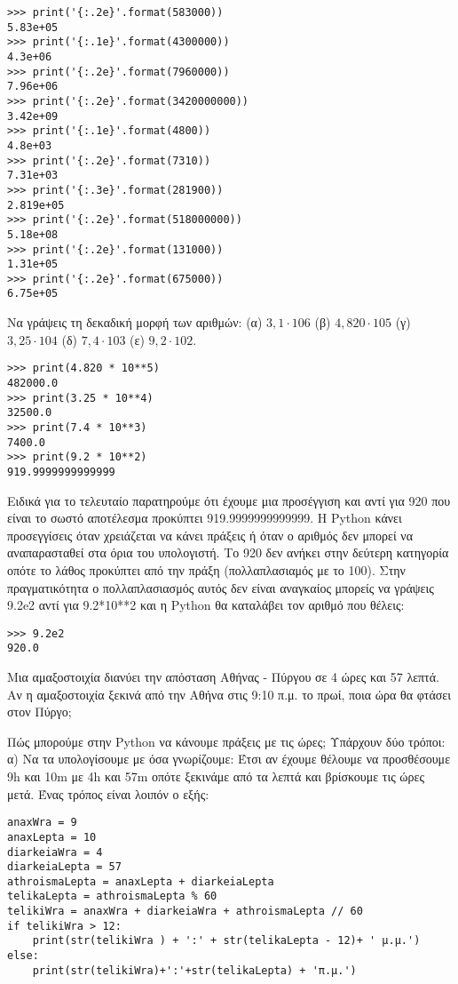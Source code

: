 \begin{lstlisting}
>>> print('{:.2e}'.format(583000))
5.83e+05
>>> print('{:.1e}'.format(4300000))
4.3e+06
>>> print('{:.2e}'.format(7960000))
7.96e+06
>>> print('{:.2e}'.format(3420000000))
3.42e+09
>>> print('{:.1e}'.format(4800))
4.8e+03
>>> print('{:.2e}'.format(7310))
7.31e+03
>>> print('{:.3e}'.format(281900))
2.819e+05
>>> print('{:.2e}'.format(518000000))
5.18e+08
>>> print('{:.2e}'.format(131000))
1.31e+05
>>> print('{:.2e}'.format(675000))
6.75e+05
\end{lstlisting}
\begin{exercise}
Nα γράψεις τη δεκαδική μορφή των αριθμών:
(α) $3,1 \cdot 106$ (β) $4,820 \cdot 105$ (γ) $3,25 \cdot 104$ (δ) $7,4 \cdot 103$ (ε) $9,2 \cdot 102$.
\end{exercise}
\begin{lstlisting}
>>> print(4.820 * 10**5)
482000.0
>>> print(3.25 * 10**4)
32500.0
>>> print(7.4 * 10**3)
7400.0
>>> print(9.2 * 10**2)
919.9999999999999
\end{lstlisting}
Ειδικά για το τελευταίο παρατηρούμε ότι έχουμε μια προσέγγιση και αντί για 920 που είναι το σωστό αποτέλεσμα προκύπτει 919.9999999999999. H Python κάνει προσεγγίσεις όταν χρειάζεται να κάνει πράξεις ή όταν ο αριθμός δεν μπορεί να αναπαρασταθεί στα όρια του υπολογιστή. Το 920 δεν ανήκει στην δεύτερη κατηγορία οπότε το λάθος προκύπτει από την πράξη (πολλαπλασιαμός με το 100). Στην πραγματικότητα ο πολλαπλασιασμός αυτός δεν είναι αναγκαίος μπορείς να γράψεις 9.2e2 αντί για 9.2*10**2 και η Python θα καταλάβει τον αριθμό που θέλεις:
\begin{lstlisting}
>>> 9.2e2
920.0
\end{lstlisting}
\begin{exercise}
Mια αμαξοστοιχία διανύει την απόσταση Αθήνας -
Πύργου σε 4 ώρες και 57 λεπτά.
Αν η αμαξοστοιχία ξεκινά από την Αθήνα στις 9:10
π.μ. το πρωί, ποια ώρα θα φτάσει στον Πύργο;
\end{exercise}
Πώς μπορούμε στην Python να κάνουμε πράξεις με τις ώρες;  Υπάρχουν δύο τρόποι:
α)
Να τα υπολογίσουμε με όσα γνωρίζουμε:
Έτσι αν έχουμε θέλουμε να προσθέσουμε 9h και 10m με 4h και 57m οπότε ξεκινάμε από τα λεπτά και βρίσκουμε τις ώρες μετά. Ένας τρόπος είναι λοιπόν ο εξής:
\begin{lstlisting}
anaxWra = 9
anaxLepta = 10
diarkeiaWra = 4
diarkeiaLepta = 57
athroismaLepta = anaxLepta + diarkeiaLepta
telikaLepta = athroismaLepta % 60
telikiWra = anaxWra + diarkeiaWra + athroismaLepta // 60
if telikiWra > 12:
    print(str(telikiWra ) + ':' + str(telikaLepta - 12)+ ' μ.μ.')
else:
    print(str(telikiWra)+':'+str(telikaLepta) + 'π.μ.')
\end{lstlisting}

